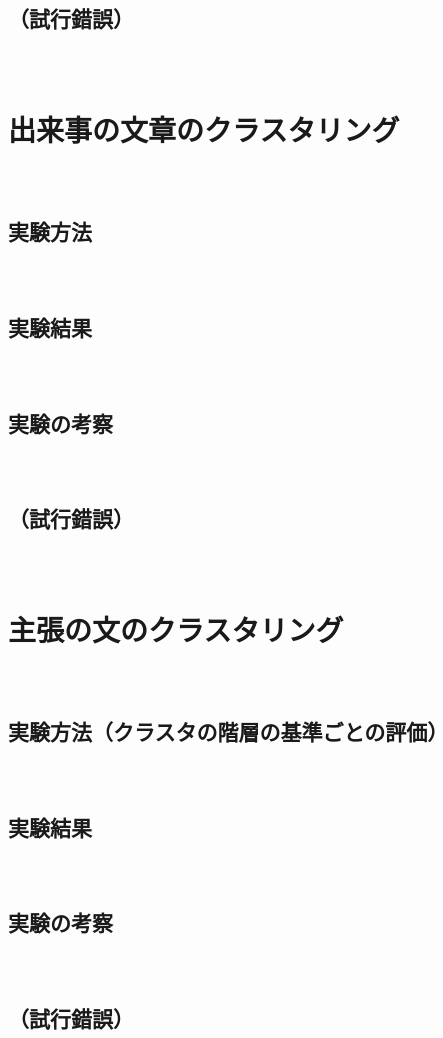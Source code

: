 \documentclass[12pt,a4j]{jreport}
\begin{document}
\subsection{（試行錯誤）}
~

\section{出来事の文章のクラスタリング}
~

\subsection{実験方法}
~

\subsection{実験結果}
~

\subsection{実験の考察}
~

\subsection{（試行錯誤）}
~

\section{主張の文のクラスタリング}
~

\subsection{実験方法（クラスタの階層の基準ごとの評価）}
~

\subsection{実験結果}
~

\subsection{実験の考察}
~

\subsection{（試行錯誤）}
~
\end{document}
